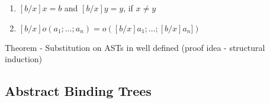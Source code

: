 \documentclass[titlepage, 12pt]{article}
\begin{document}
\begin{enumerate}

	\item$[b/x]x = b$ and $[b/x]y = y$, if $x\neq y$

	\item$[b/x]o(a_1;\ldots;a_n) = o([b/x]a_1;\ldots;[b/x]a_n])$

\end{enumerate}

Theorem - Substitution on ASTs in well defined (proof idea - structural
induction)

\subsection{Abstract Binding Trees}
\end{document}
